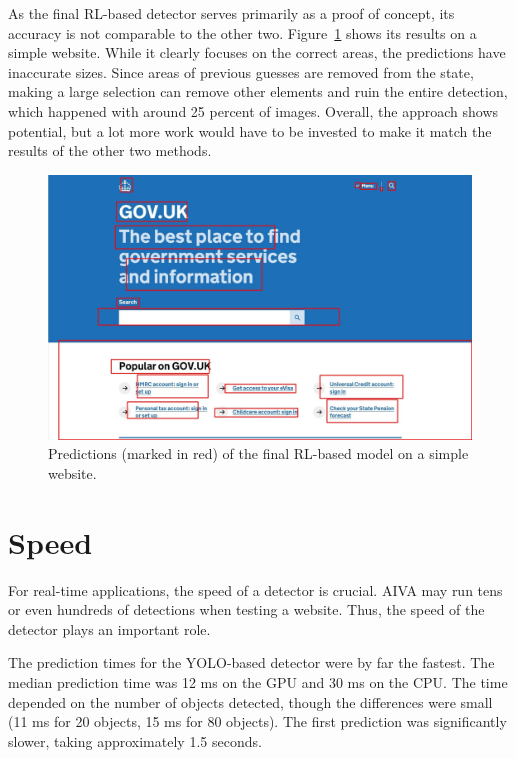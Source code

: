 \documentclass[
  digital,     %
  oneside,     %
  nosansbold,  %
  nocolorbold, %
  lof,         %
  lot,         %
]{fithesis4}
\begin{document}
As the final RL-based detector serves primarily as a proof of concept, its accuracy is not comparable to the other two. Figure~\ref{fig:gov_predict_rl} shows its results on a simple website. While it clearly focuses on the correct areas, the predictions have inaccurate sizes. Since areas of previous guesses are removed from the state, making a large selection can remove other elements and ruin the entire detection, which happened with around 25 percent of images. Overall, the approach shows potential, but a lot more work would have to be invested to make it match the results of the other two methods.

\begin{figure}
    \centering
    \includegraphics[width=1\linewidth]{results/rl_pred_gov.jpg}
    \caption{Predictions (marked in red) of the final RL-based model on a simple website.}
    \label{fig:gov_predict_rl}
\end{figure}

\section{Speed}
\label{sec:speed}

For real-time applications, the speed of a detector is crucial. AIVA may run tens or even hundreds of detections when testing a website. Thus, the speed of the detector plays an important role.

The prediction times for the YOLO-based detector were by far the fastest. The median prediction time was 12 ms on the GPU and 30 ms on the CPU. The time depended on the number of objects detected, though the differences were small (11 ms for 20 objects, 15 ms for 80 objects). The first prediction was significantly slower, taking approximately 1.5 seconds.
\end{document}
